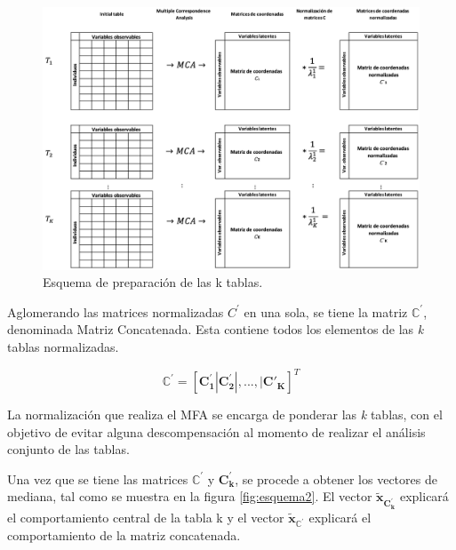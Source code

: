 \documentclass[mathematics,article,submit,moreauthors,pdftex]{mdpi}
\begin{document}
\begin{figure}[!h]


\begin{center}\includegraphics[width=0.9\linewidth,]{esquema_1} \end{center}

\caption{Esquema de preparación de las k tablas.}

\label{fig:esquema1}
\end{figure}

Aglomerando las matrices normalizadas \(C^{'}\) en una sola, se tiene la
matriz \(\mathbb{C}^{'}\), denominada Matriz Concatenada. Esta contiene
todos los elementos de las \emph{k} tablas normalizadas.

\begin{equation}
\mathbf{\mathbb{C^{'}}}=[\mathbf{C_1^{'}}|\mathbf{C_2^{'}}|,...,|\mathbf{C'_{K}}]^{T}
\label{eq:Cprima}
\end{equation}

La normalización que realiza el MFA se encarga de ponderar las \emph{k}
tablas, con el objetivo de evitar alguna descompensación al momento de
realizar el análisis conjunto de las tablas.

Una vez que se tiene las matrices \(\mathbf{\mathbb{C^{'}}}\) y
\(\mathbf{C_k^{'}}\), se procede a obtener los vectores de mediana, tal
como se muestra en la figura \ref{fig:esquema2}. El vector
\(\mathbf{\tilde{x}_{C_k^{'}}}\) explicará el comportamiento central de
la tabla k y el vector \(\mathbf{\tilde{x}_{\mathbb{C^{'}}}}\) explicará
el comportamiento de la matriz concatenada.
\end{document}
